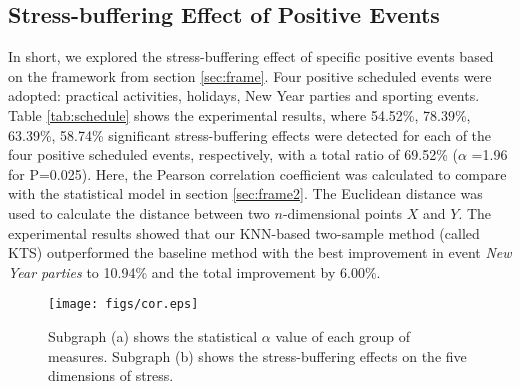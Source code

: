 \documentclass[5p,times,numbers,authoryear]{elsarticle}
\begin{document}
\subsection{Stress-buffering Effect of Positive Events}
\label{subsec:experiment}
\begin{table}[h]
\begin{center}
\caption{\small{Quantification of the stress-buffering effect of positive scheduled events applying the KTS model (the KNN-based two-sample method adopted in this research) and the baseline method.}}
\label{tab:schedule}
\end{center}
\end{table}
In short, we explored the stress-buffering effect of specific positive events based on the framework from section \ref{sec:frame}.
Four positive scheduled events were adopted:
practical activities, holidays, New Year parties and sporting events.
Table \ref{tab:schedule} shows the experimental results,
where 54.52\%, 78.39\%, 63.39\%, 58.74\% significant stress-buffering effects were detected for
each of the four positive scheduled events, respectively, with a total ratio of 69.52\% ($\alpha$ =1.96 for P=0.025).
Here, the Pearson correlation coefficient was calculated to compare with the statistical model in section \ref{sec:frame2}.
The Euclidean distance was used to calculate the distance between two $n$-dimensional points $X$ and $Y$.
The experimental results showed that our KNN-based two-sample method (called KTS) outperformed the baseline method with the best improvement in event \emph{New Year parties} to 10.94\% and the total improvement by 6.00\%.

\begin{figure}[h]
\centering
\texttt{[image: figs/cor.eps]}%
\caption{\small{ Subgraph (a) shows the statistical $\alpha$ value of each group of measures.
Subgraph (b) shows the stress-buffering effects on the five dimensions of stress.}}
\label{fig:correlation}
\end{figure}
\end{document}
